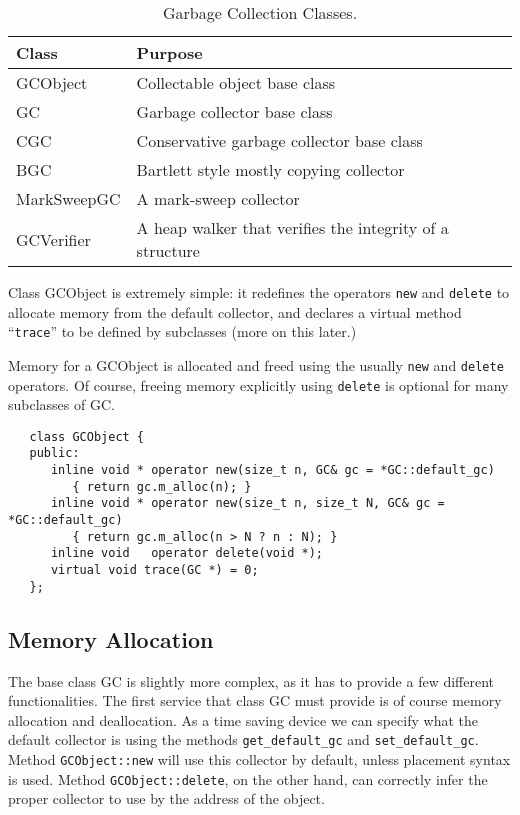 \begin{table}
   \begin{center}
      \begin{tabular}{|l|l|} \hline
        Class           & Purpose \\ \hline \hline
        \sf GCObject    & Collectable object base class \\
        \sf GC          & Garbage collector base class \\
        \sf CGC         & Conservative garbage collector base class \\
        \sf BGC         & Bartlett style mostly copying collector \\
        \sf MarkSweepGC & A mark-sweep collector \\
        \sf GCVerifier  & A heap walker that verifies the integrity of a 
                          structure \\
      \hline 
      \end{tabular}
   \end{center}
   \caption{\label{GC-Classes} Garbage Collection Classes.}
\end{table}

Class {\sf GCObject} is extremely simple: it redefines the operators
\verb|new| and \verb|delete| to allocate memory from the default collector,
and declares a virtual method ``\verb|trace|'' to be defined by subclasses
(more on this later.)

Memory for a {\sf GCObject} is allocated and freed using the usually
\verb|new| and \verb|delete| operators.  Of course, freeing memory explicitly
using \verb|delete| is optional for many subclasses of {\sf GC}. 

\begin{verbatim}
   class GCObject {
   public:
      inline void * operator new(size_t n, GC& gc = *GC::default_gc) 
         { return gc.m_alloc(n); }
      inline void * operator new(size_t n, size_t N, GC& gc = *GC::default_gc) 
         { return gc.m_alloc(n > N ? n : N); }
      inline void   operator delete(void *);
      virtual void trace(GC *) = 0;
   };
\end{verbatim}

\subsection{Memory Allocation}

The base class {\sf GC} is slightly more complex, as it has to provide
a few different functionalities.  The first service that class {\sf GC} must 
provide is of course memory allocation and deallocation.  As a time saving
device we can specify what the default collector is using the methods
\verb|get_default_gc| and \verb|set_default_gc|.  Method \verb|GCObject::new| 
will use this collector by default, unless placement syntax is used.
Method \verb|GCObject::delete|, on the other hand, can correctly infer the 
proper collector to use by the address of the object.

